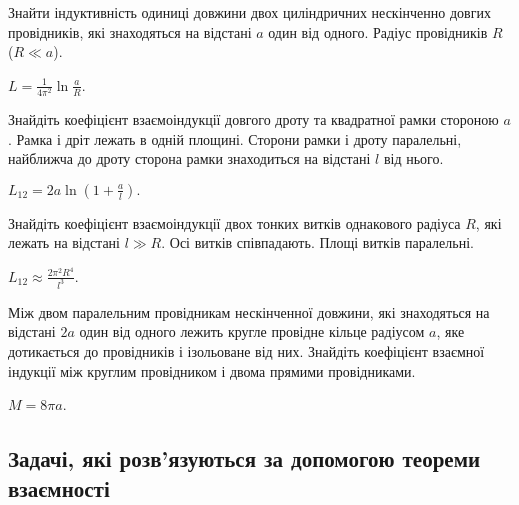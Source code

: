 \begin{problem}\label{prb:inductance_two_wires}
Знайти індуктивність одиниці довжини двох циліндричних нескінченно довгих провідників, які знаходяться на відстані $a$ один від одного. Радіус провідників $R$ ($R \ll a$).
\begin{solution}
	$L = \frac{1}{4\pi^2}\ln\frac{a}{R}$.
\end{solution}
\end{problem}

\begin{problem}
    Знайдіть коефіцієнт взаємоіндукції довгого дроту та квадратної рамки стороною $a$. Рамка і дріт лежать в одній площині. Сторони рамки і дроту паралельні, найближча до дроту сторона рамки знаходиться на відстані $l$ від нього.
\begin{solution}
	$L_{12} = 2a\ln\left( 1 + \frac{a}{l}\right).$
\end{solution}
\end{problem}

\begin{problem}
    Знайдіть коефіцієнт взаємоіндукції двох тонких витків однакового радіуса $R$, які лежать на відстані $l \gg R$. Осі витків співпадають. Площі витків паралельні.
\begin{solution}
	$L_{12} \approx \frac{2\pi^2R^4}{l^3}$.
\end{solution}
\end{problem}


\begin{problem}
Між двом паралельним провідникам нескінченної довжини, які знаходяться на відстані $2a$ один від одного лежить кругле провідне кільце радіусом $a$, яке дотикається до провідників і ізольоване від них. Знайдіть коефіцієнт взаємної індукції між круглим провідником і двома прямими провідниками.
\begin{solution}
	$M = 8\pi a$.
\end{solution}
\end{problem}

\subsection*{Задачі, які розв'язуються за допомогою теореми взаємності}

